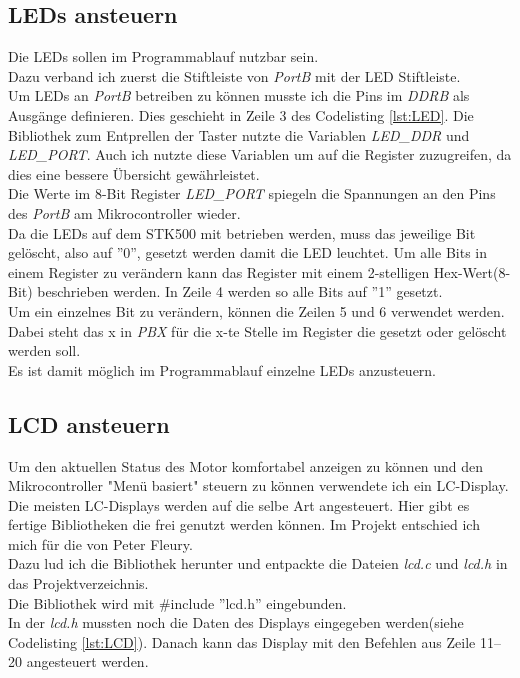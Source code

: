 \subsection{LEDs ansteuern}
Die LEDs sollen im Programmablauf nutzbar sein.\\
Dazu verband ich zuerst die Stiftleiste von \emph{PortB} mit der LED Stiftleiste.\\
Um LEDs an \emph{PortB} betreiben zu können musste ich die Pins im  \emph{DDRB} als Ausgänge definieren. Dies geschieht in Zeile 3 des Codelisting \ref{lst:LED}. Die Bibliothek zum Entprellen der Taster nutzte die Variablen \emph{LED\_DDR} und \emph{LED\_PORT}. Auch ich nutzte diese Variablen um auf die Register zuzugreifen, da dies eine bessere Übersicht gewährleistet.\\
Die Werte im 8-Bit Register \emph{LED\_PORT} spiegeln die Spannungen an den Pins des \emph{PortB} am Mikrocontroller wieder.\\
Da die LEDs auf dem STK500 mit  betrieben werden, muss das jeweilige Bit gelöscht, also auf ''0'', gesetzt werden damit die LED leuchtet.
Um alle Bits in einem Register zu verändern kann das Register mit einem 2-stelligen Hex-Wert(8-Bit) beschrieben werden. In Zeile 4 werden so alle Bits auf ''1'' gesetzt.\\
Um ein einzelnes Bit zu verändern, können die Zeilen 5 und 6 verwendet werden. Dabei steht das x in \emph{PBX} für die x-te Stelle im Register die gesetzt oder gelöscht werden soll.\\
Es ist damit möglich im Programmablauf einzelne LEDs anzusteuern.

\lstset{language=C, basicstyle=\footnotesize, showstringspaces=false, tabsize=8}


\subsection{LCD ansteuern}
Um den aktuellen Status des Motor komfortabel anzeigen zu können und den Mikrocontroller "Menü basiert" steuern zu können verwendete ich ein LC-Display.\\
Die meisten LC-Displays werden auf die selbe Art angesteuert. Hier gibt es fertige Bibliotheken die frei genutzt werden können. Im Projekt entschied ich mich für die von Peter Fleury\cite{uC:Fleury}.\\
Dazu lud ich die Bibliothek herunter und entpackte die Dateien \emph{lcd.c} und \emph{lcd.h} in das Projektverzeichnis. \\
Die Bibliothek wird mit \#include ''lcd.h'' eingebunden.\\
In der \emph{lcd.h} mussten noch die Daten des Displays eingegeben werden(siehe Codelisting \ref{lst:LCD}).
Danach kann das Display mit den Befehlen aus Zeile 11--20 angesteuert werden.

